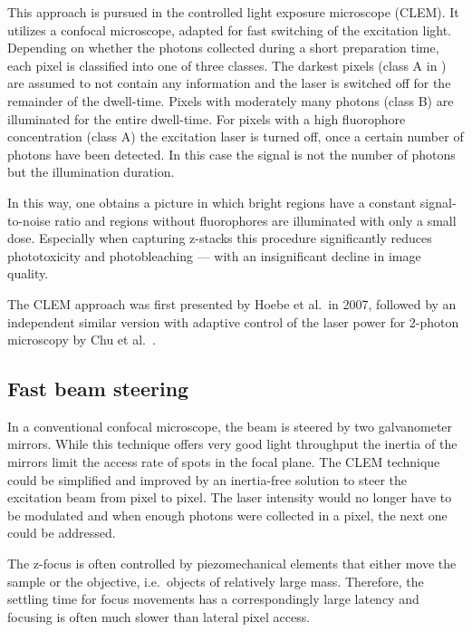 This approach is pursued in the controlled light exposure microscope
(CLEM). It utilizes a confocal microscope, adapted for fast switching
of the excitation light. Depending on whether the photons collected
during a short preparation time, each pixel is classified into one of
three classes. The darkest pixels (class A in ) are
assumed to not contain any information and the laser is switched off
for the remainder of the dwell-time. Pixels with moderately many
photons (class B) are illuminated for the entire dwell-time. For
pixels with a high fluorophore concentration (class A) the excitation
laser is turned off, once a certain number of photons have been
detected. In this case the signal is not the number of photons but the
illumination duration.

In this way, one obtains a picture in which bright regions have a
constant signal-to-noise ratio and regions without fluorophores are
illuminated with only a small dose. Especially when capturing z-stacks
this procedure significantly reduces phototoxicity and photobleaching
--- with an insignificant decline in image quality.


The CLEM approach was first presented by Hoebe et al.\ in 2007,
followed by an independent similar version with adaptive control of
the laser power for 2-photon microscopy by Chu et al.\
\citep{Hoebe2007,Chu2007}.

\subsection{Fast beam steering}
In a conventional confocal microscope, the beam is steered by two
galvanometer mirrors. While this technique offers very good light
throughput the inertia of the mirrors limit the access rate of spots
in the focal plane. The CLEM technique could be simplified and
improved by an inertia-free solution to steer the excitation beam from
pixel to pixel. The laser intensity would no longer have to be
modulated and when enough photons were collected in a pixel, the next
one could be addressed.

The z-focus is often controlled by piezomechanical elements that
either move the sample or the objective, i.e.\ objects of relatively
large mass. Therefore, the settling time for focus movements has a
correspondingly large latency and focusing is often much slower than
lateral pixel access.

